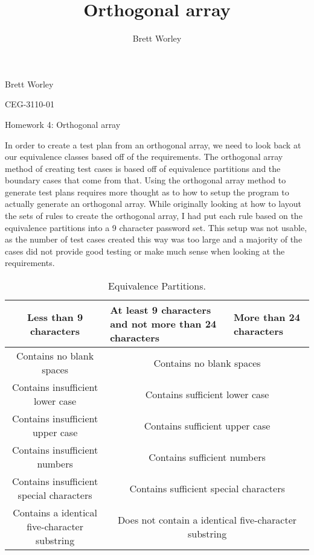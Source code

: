 \documentclass[12pt,letterpaper]{article}
\author{Brett Worley}
\title{Orthogonal array}
\begin{document}
Brett Worley

CEG-3110-01

\centerline{ Homework 4: Orthogonal array}

In order to create a test plan from an orthogonal array, we need to look back at our equivalence classes
based off of the requirements. The orthogonal array method of creating test cases is based off of equivalence partitions
and the boundary cases that come from that. Using the orthogonal array method to generate test plans requires more thought
as to how to setup the program to actually generate an orthogonal array. While originally looking at how to layout
the sets of rules to create the orthogonal array, I had put each rule based on the equivalence partitions into
a 9 character password set. This setup was not usable, as the number of test cases created this way was too large
and a majority of the cases did not provide good testing or make much sense when looking at the requirements.


\begin{table}[h!]
  \begin{center}
    \caption{Equivalence Partitions.}
    \label{tab:Equiv}
    
    \begin{tabular}{||c|m{4cm}|m{5cm}||}
    \hline
    Less than 9 characters & At least 9 characters and not more than 24
    characters & More than 24 characters \\
    
    \hline \hline
    \multicolumn{1}{||c|}{Contains no blank spaces} & \multicolumn{2}{c||}{Contains no blank spaces} \\
    
    \hline \hline
    \multicolumn{1}{||c|}{Contains insufficient lower case} 
    & \multicolumn{2}{c||}{Contains sufficient lower case} \\
    
    \hline \hline
    \multicolumn{1}{||c|}{Contains insufficient upper case} 
    & \multicolumn{2}{c||}{Contains sufficient upper case} \\
    
    \hline \hline
    \multicolumn{1}{||c|}{Contains insufficient numbers} 
    & \multicolumn{2}{c||}{Contains sufficient numbers} \\
    
    \hline \hline
    \multicolumn{1}{||c|}{Contains insufficient special characters} 
    & \multicolumn{2}{c||}{Contains sufficient special characters} \\
    
    \hline \hline
    \multicolumn{1}{||c|}{Contains a identical five-character substring}
    & \multicolumn{2}{c||}{Does not contain a identical five-character substring} \\
    \hline
    \end{tabular}
  \end{center}
\end{table}
\end{document}
